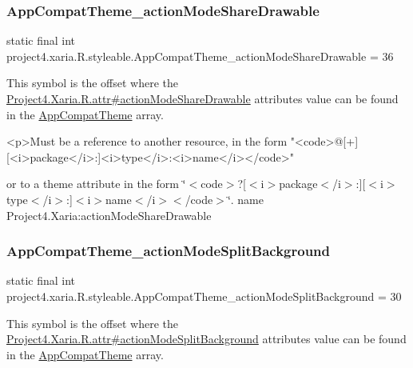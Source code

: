 \subsubsection{\texorpdfstring{App\+Compat\+Theme\+\_\+action\+Mode\+Share\+Drawable}{AppCompatTheme\_actionModeShareDrawable}}
{\footnotesize\ttfamily static final int project4.\+xaria.\+R.\+styleable.\+App\+Compat\+Theme\+\_\+action\+Mode\+Share\+Drawable = 36\hspace{0.3cm}{\ttfamily [static]}}

This symbol is the offset where the \hyperlink{}{Project4.\+Xaria.\+R.\+attr\#action\+Mode\+Share\+Drawable} attribute\textquotesingle{}s value can be found in the \hyperlink{classproject4_1_1xaria_1_1R_1_1styleable_aad8bec413e2350f9404e6ff0e831a85d}{App\+Compat\+Theme} array.

\begin{DoxyVerb}      <p>Must be a reference to another resource, in the form "<code>@[+][<i>package</i>:]<i>type</i>:<i>name</i></code>"
\end{DoxyVerb}
 or to a theme attribute in the form \char`\"{}$<$code$>$?\mbox{[}$<$i$>$package$<$/i$>$\+:\mbox{]}\mbox{[}$<$i$>$type$<$/i$>$\+:\mbox{]}$<$i$>$name$<$/i$>$$<$/code$>$\char`\"{}.  name Project4.\+Xaria\+:action\+Mode\+Share\+Drawable \mbox{\label{classproject4_1_1xaria_1_1R_1_1styleable_a9e837df09f706dbb1c0d790a493f48ba}} 
\subsubsection{\texorpdfstring{App\+Compat\+Theme\+\_\+action\+Mode\+Split\+Background}{AppCompatTheme\_actionModeSplitBackground}}
{\footnotesize\ttfamily static final int project4.\+xaria.\+R.\+styleable.\+App\+Compat\+Theme\+\_\+action\+Mode\+Split\+Background = 30\hspace{0.3cm}{\ttfamily [static]}}

This symbol is the offset where the \hyperlink{}{Project4.\+Xaria.\+R.\+attr\#action\+Mode\+Split\+Background} attribute\textquotesingle{}s value can be found in the \hyperlink{classproject4_1_1xaria_1_1R_1_1styleable_aad8bec413e2350f9404e6ff0e831a85d}{App\+Compat\+Theme} array.

